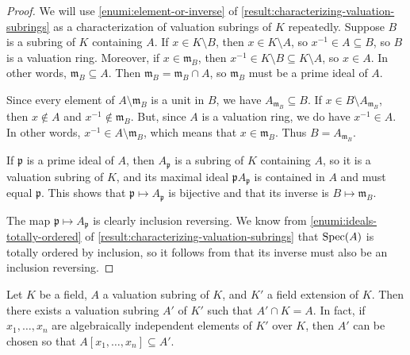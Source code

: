 \begin{proof}
We will use \cref{enumi:element-or-inverse} of \cref{result:characterizing-valuation-subrings} as a characterization of valuation subrings of $K$ repeatedly. 
Suppose $B$ is a subring of $K$ containing $A$. If $x \in K \setminus B$, then $x \in K \setminus A$, so $x^{-1} \in A \subseteq B$, so $B$ is a valuation ring. Moreover, if $x \in \mathfrak{m}_B$, then $x^{-1} \in K \setminus B \subseteq K \setminus A$, so $x \in A$. In other words, $\mathfrak{m}_B \subseteq A$. Then $\mathfrak{m}_B = \mathfrak{m}_B \cap A$, so $\mathfrak{m}_B$ must be a prime ideal of $A$. 
	
Since every element of $A \setminus \mathfrak{m}_B$ is a unit in $B$, we have $A_{\mathfrak{m}_B} \subseteq B$. If $x \in B \setminus A_{\mathfrak{m}_B}$, then $x \notin A$ and $x^{-1} \notin \mathfrak{m}_B$. But, since $A$ is a valuation ring, we do have $x^{-1} \in A$. In other words, $x^{-1} \in A \setminus \mathfrak{m}_B$, which means that $x \in \mathfrak{m}_B$. Thus $B = A_{\mathfrak{m}_B}$. 

If $\mathfrak{p}$ is a prime ideal of $A$, then $A_{\mathfrak{p}}$ is a subring of $K$ containing $A$, so it is a valuation subring of $K$, and its maximal ideal $\mathfrak{p}A_{\mathfrak{p}}$ is contained in $A$ and must equal $\mathfrak{p}$. This shows that $\mathfrak{p} \mapsto A_{\mathfrak{p}}$ is bijective and that its inverse is $B \mapsto \mathfrak{m}_B$. 

The map $\mathfrak{p} \mapsto A_{\mathfrak{p}}$ is clearly inclusion reversing. We know from \cref{enumi:ideals-totally-ordered} of \cref{result:characterizing-valuation-subrings} that $\operatorname{Spec}(A)$ is totally ordered by inclusion, so it follows from  that its inverse must also be an inclusion reversing. 
\end{proof}

\begin{lemma}
\label{result:extension-of-valuation-subring}
Let $K$ be a field, $A$ a valuation subring of $K$, and $K'$ a field extension of $K$. Then there exists a valuation subring $A'$ of $K'$ such that $A' \cap K = A$. In fact, if $x_1, \dotsc, x_n$ are algebraically independent elements of $K'$ over $K$, then $A'$ can be chosen so that $A[x_1,  \dotsc, x_n] \subseteq A'$.  
\end{lemma}

